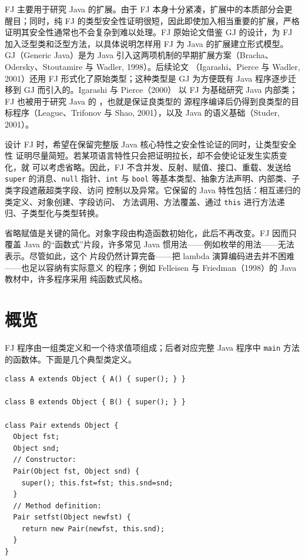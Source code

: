 FJ 主要用于研究 Java 的扩展。由于 FJ 本身十分紧凑，扩展中的本质部分会更
醒目；同时，纯 FJ 的类型安全性证明很短，因此即使加入相当重要的扩展，严格
证明其安全性通常也不会复杂到难以处理。FJ 原始论文借鉴 GJ 的设计，为 FJ
加入泛型类和泛型方法，以具体说明怎样用 FJ 为 Java 的扩展建立形式模型。
GJ（Generic Java）是为 Java
引入这两项机制的早期扩展方案（Bracha、Odersky、Stoutamire 与 Wadler,
1998）。后续论文
（Igarashi、Pierce 与 Wadler, 2001）还用 FJ 形式化了原始类型；这种类型是
GJ 为方便既有 Java 程序逐步迁移到 GJ 而引入的。Igarashi 与 Pierce（2000）
以 FJ 为基础研究 Java 内部类；FJ 也被用于研究 Java 的
，也就是保证良类型的
源程序编译后仍得到良类型的目标程序（League、Trifonov 与 Shao, 2001），以及
Java 的语义基础（Studer, 2001）。

设计 FJ 时，希望在保留完整版 Java 核心特性之安全性论证的同时，让类型安全性
证明尽量简短。若某项语言特性只会把证明拉长，却不会使论证发生实质变化，就
可以考虑省略。因此，FJ 不含并发、反射、赋值、接口、重载、发送给
\texttt{super} 的消息、\texttt{null} 指针、\texttt{int} 与
\texttt{bool} 等基本类型、抽象方法声明、内部类、子类字段遮蔽超类字段、访问
控制以及异常。它保留的 Java 特性包括：相互递归的类定义、对象创建、字段访问、
方法调用、方法覆盖、通过 \texttt{this} 进行方法递归、子类型化与类型转换。

省略赋值是关键的简化。对象字段由构造函数初始化，此后不再改变。FJ 因而只
覆盖 Java 的“函数式”片段，许多常见 Java 惯用法——例如枚举的用法——无法
表示。尽管如此，这个
片段仍然计算完备——把 lambda 演算编码进去并不困难——也足以容纳有实际意义
的程序；例如 Felleisen 与 Friedman（1998）的 Java 教材中，许多程序采用
纯函数式风格。


\section{概览}
\label{sec:19.2}

FJ 程序由一组类定义和一个待求值项组成；后者对应完整 Java 程序中
\texttt{main} 方法的函数体。下面是几个典型类定义。

\begin{lstlisting}
class A extends Object { A() { super(); } }

class B extends Object { B() { super(); } }

class Pair extends Object {
  Object fst;
  Object snd;
  // Constructor:
  Pair(Object fst, Object snd) {
    super(); this.fst=fst; this.snd=snd;
  }
  // Method definition:
  Pair setfst(Object newfst) {
    return new Pair(newfst, this.snd);
  }
}
\end{lstlisting}

